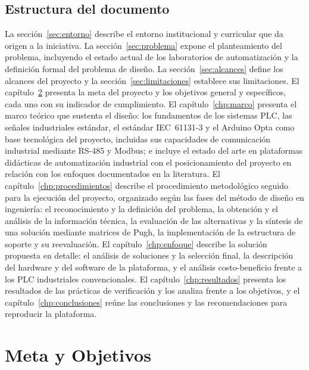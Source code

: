 \documentclass[12pt,a4paper,oneside]{report}
\begin{document}
\section{Estructura del documento}
\label{sec:estructura}

La sección~\ref{sec:entorno} describe el entorno institucional y curricular que da origen a la
iniciativa. La sección~\ref{sec:problema} expone el planteamiento del problema, incluyendo el
estado actual de los laboratorios de automatización y la definición formal del problema de diseño.
La sección~\ref{sec:alcances} define los alcances del proyecto y la sección~\ref{sec:limitaciones}
establece sus limitaciones. El capítulo~\ref{chp:metaobj} presenta la meta del proyecto y los
objetivos general y específicos, cada uno con su indicador de cumplimiento. El capítulo~\ref{chp:marco}
presenta el marco teórico que sustenta el diseño: los fundamentos de los sistemas PLC, las señales
industriales estándar, el estándar IEC~61131-3 y el Arduino Opta como base tecnológica del proyecto, incluidas sus
capacidades de comunicación industrial mediante RS-485 y Modbus;
e incluye el estado del arte en plataformas didácticas de automatización industrial con el
posicionamiento del proyecto en relación con los enfoques documentados en la literatura. El
capítulo~\ref{chp:procedimientos} describe el procedimiento metodológico seguido para la ejecución
del proyecto, organizado según las fases del método de diseño en ingeniería: el reconocimiento y la
definición del problema, la obtención y el análisis de la información técnica, la evaluación de las
alternativas y la síntesis de una solución mediante matrices de Pugh, la implementación de la
estructura de soporte y su reevaluación. El capítulo~\ref{chp:enfoque} describe la solución
propuesta en detalle: el análisis de soluciones y la selección final, la descripción del hardware
y del software de la plataforma, y el análisis costo-beneficio frente a los PLC industriales convencionales. El capítulo~\ref{chp:resultados} presenta los resultados de las prácticas de verificación y los analiza frente a los objetivos, y el capítulo~\ref{chp:conclusiones} reúne las conclusiones y las recomendaciones para reproducir la plataforma.

\chapter{Meta y Objetivos}
\label{chp:metaobj}
\end{document}
